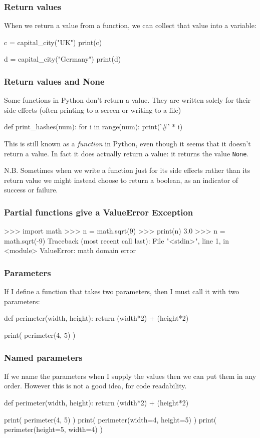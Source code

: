 \documentclass{beamer}
\begin{document}
\begin{frame}[fragile]
\frametitle{Return values}
When we return a value from a function, we can collect that value into
a variable:
\begin{code}
c = capital_city("UK")
print(c)

d = capital_city("Germany")
print(d) 
\end{code}
\end{frame}

\begin{frame}[fragile]
\frametitle{Return values and None}
Some functions in Python don't return a value. They are written
solely for their side effects (often printing to a screen or writing
to a file)
\begin{code}
def print_hashes(num):
   for i in range(num):
      print('#' * i)
\end{code}

This is still known as a {\em function} in Python, even though it seems
that it doesn't return a value. In fact it does actually return a
value: it returns the value \texttt{None}. 

\bigskip

N.B. Sometimes when we write a function just for its side effects rather than
its return value we might instead choose to return a boolean,
as an indicator of success or failure.
\end{frame}

\begin{frame}[fragile]
\frametitle{Partial functions give a ValueError Exception}
\begin{code}
>>> import math
>>> n = math.sqrt(9)
>>> print(n)
3.0
>>> n = math.sqrt(-9)
Traceback (most recent call last):
  File "<stdin>", line 1, in <module>
ValueError: math domain error
\end{code}
\end{frame}

\begin{frame}[fragile]
\frametitle{Parameters}
If I define a function that takes two parameters, then I must call it
with two parameters:
\begin{code}
def perimeter(width, height):
   return (width*2) + (height*2)

print( perimeter(4, 5) )
\end{code}

\end{frame}

\begin{frame}[fragile]
\frametitle{Named parameters}
If we name the parameters when I supply the values then we can put
them in any order. However this is not a good idea, for code readability.
\begin{code}
def perimeter(width, height):
   return (width*2) + (height*2)

print( perimeter(4, 5) )
print( perimeter(width=4, height=5) )
print( perimeter(height=5, width=4) )
\end{code}
\end{frame}
\end{document}
